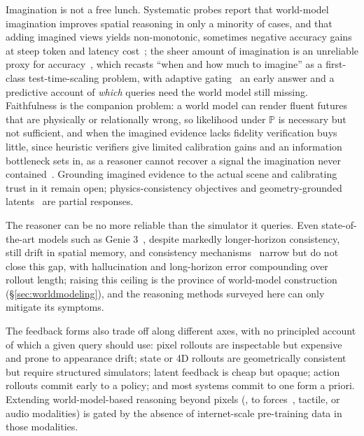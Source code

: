 Imagination is not a free lunch. Systematic probes report that world-model imagination improves spatial reasoning in only a minority of cases, and that adding imagined views yields non-monotonic, sometimes negative accuracy gains at steep token and latency cost~\cite{yu2026avic,jha2025probing}; the sheer amount of imagination is an unreliable proxy for accuracy~\cite{zhang2025scaling}, which recasts ``when and how much to imagine'' as a first-class test-time-scaling problem, with adaptive gating~\cite{yu2026avic} an early answer and a predictive account of \emph{which} queries need the world model still missing.
Faithfulness is the companion problem: a world model can render fluent futures that are physically or relationally wrong, so likelihood under $\mathbb{P}$ is necessary but not sufficient, and when the imagined evidence lacks fidelity verification buys little, since heuristic verifiers give limited calibration gains and an information bottleneck sets in, as a reasoner cannot recover a signal the imagination never contained~\cite{jha2025probing}. Grounding imagined evidence to the actual scene and calibrating trust in it remain open; physics-consistency objectives and geometry-grounded latents~\cite{chen20253dthinker} are partial responses.

The reasoner can be no more reliable than the simulator it queries. Even state-of-the-art models such as Genie 3~\cite{genie3}, despite markedly longer-horizon consistency, still drift in spatial memory, and consistency mechanisms~\cite{zhou2025learning,li2025vmem} narrow but do not close this gap, with hallucination and long-horizon error compounding over rollout length; raising this ceiling is the province of world-model construction (§\ref{sec:worldmodeling}), and the reasoning methods surveyed here can only mitigate its symptoms.

The feedback forms also trade off along different axes, with no principled account of which a given query should use: pixel rollouts are inspectable but expensive and prone to appearance drift; state or 4D rollouts are geometrically consistent but require structured simulators; latent feedback is cheap but opaque; action rollouts commit early to a policy; and most systems commit to one form a priori. Extending world-model-based reasoning beyond pixels (\eg, to forces~\cite{gillman2025force}, tactile, or audio modalities) is gated by the absence of internet-scale pre-training data in those modalities.

